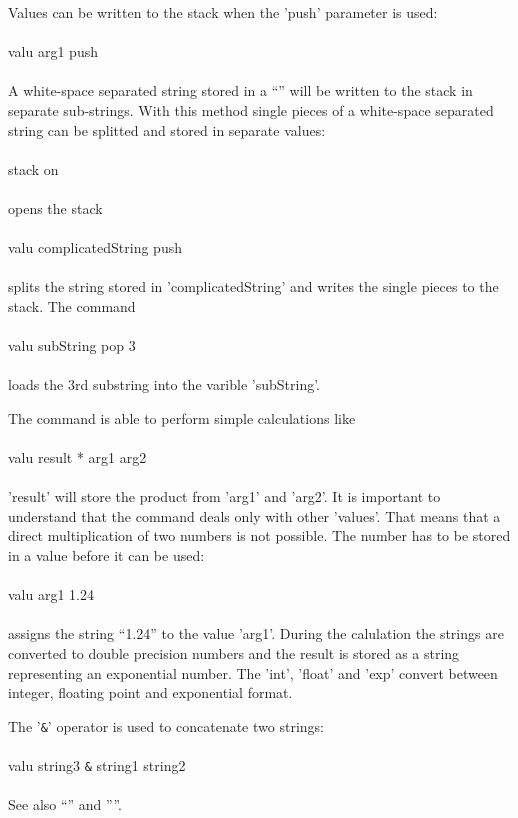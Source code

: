 \documentclass{article}
\begin{document}
Values can be written to the stack when the 'push' parameter is used:\\\\valu arg1 push\\\\A white-space separated string stored in a ``'' will be written to the stack in separate sub-strings. With this method single pieces of a white-space separated string can be splitted and stored in separate values:\\\\stack on\\\\opens the stack\\\\valu complicatedString push\\\\splits the string stored in 'complicatedString' and writes the single pieces to the stack. The command \\\\valu subString pop 3\\\\loads the 3rd substring into the varible 'subString'.


The command is able to perform simple calculations like\\\\valu result * arg1 arg2\\\\'result' will store the product from 'arg1' and 'arg2'. It is important to understand that the command deals only with other 'values'. That means that a direct multiplication of two numbers is not possible. The number has to be stored in a value before it can be used:\\\\valu arg1 1.24\\\\assigns the string ``1.24'' to the value 'arg1'. During the calulation the strings are converted to double precision numbers and the result is stored as a string representing an exponential number. The 'int', 'float' and 'exp' convert between integer, floating point and exponential format.

The '\verb_&_' operator is used to concatenate two strings:\\\\valu string3 \verb_&_ string1 string2\\\\

See also ``'' and ''''.
\end{document}
